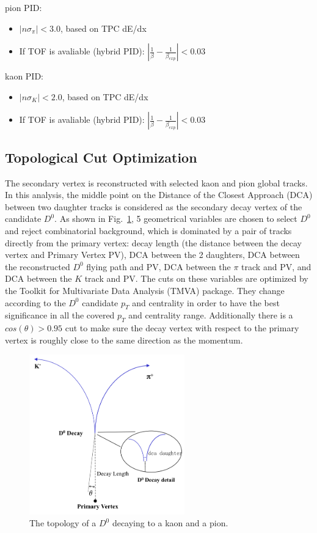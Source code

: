 pion PID:
\begin{itemize}
  \item $|n\sigma_{\pi}| < 3.0 $, based on TPC dE/dx
  \item If TOF is avaliable (hybrid PID):  $|\frac{1}{\beta}-\frac{1}{\beta_{exp}}|<0.03$
\end{itemize}

kaon PID:
\begin{itemize}
  \item $|n\sigma_{K}| < 2.0 $, based on TPC dE/dx
  \item If TOF is avaliable (hybrid PID):  $|\frac{1}{\beta}-\frac{1}{\beta_{exp}}|<0.03$
\end{itemize}


\subsection{Topological Cut Optimization}

The secondary vertex is reconstructed with selected kaon and pion global tracks. In this analysis, the middle point on the Distance of the Closest Approach (DCA) between two daughter tracks is considered as the secondary decay vertex of the candidate $D^0$. As shown in Fig.~\ref{fig:D0cartoon}, 5 geometrical variables are chosen to select $D^0$ and reject combinatorial background, which is dominated by a pair of tracks directly from the primary vertex: decay length (the distance between the decay vertex and Primary Vertex PV), DCA between the 2 daughters, DCA between the reconstructed $D^0$ flying path and PV, DCA between the $\pi$ track and PV, and DCA between the $K$ track and PV. The cuts on these variables are optimized by the Toolkit for Multivariate Data Analysis (TMVA) package. They change according to the $D^0$ candidate $p_T$ and centrality in order to have the best significance in all the covered $p_T$ and centrality range. Additionally there is a $cos(\theta) > 0.95$ cut to make sure the decay vertex with respect to the primary vertex is roughly close to the same direction as the momentum.

\begin{figure}[htbp]
\centering
\includegraphics[keepaspectratio,width=0.6\textwidth]{figure/Run14_D0HFT/D0cartoon.png}
\caption{The topology of a $D^0$ decaying to a kaon and a pion.}
 \label{fig:D0cartoon}
\end{figure}

